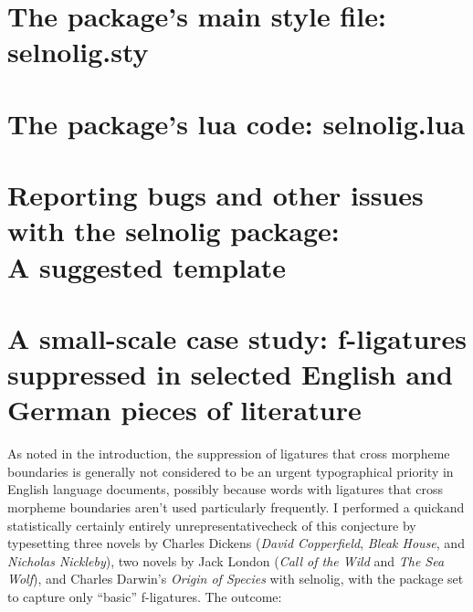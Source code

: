 \documentclass[11pt]{article}
\newcommand{\pkg}[1]{\textsf{#1}}
\begin{document}
\bigskip

\begin{multicols}{2}
\end{multicols}

\clearpage
\section[The package's main style file: selnolig.sty]
{The package's main style file: \pkg{selnolig.sty}}
\label{sec:sty}


\clearpage
\section[The package's lua code: selnolig.lua]{The package's lua code: \pkg{selnolig.lua}}
\label{sec:luacode}


\clearpage

\section[Reporting bugs and other issues with the selnolig package: A suggested template]{Reporting bugs and other issues with the \pkg{selnolig} package:\\A suggested template} \label{sec:template}


\clearpage
\selnoligon
\section{A small-scale case study: f-ligatures suppressed in selected English and German pieces of literature} \label{sec:budd}

As noted in the introduction, the suppression of ligatures that cross morpheme boundaries is generally not considered to be an urgent typographical priority in English language documents, possibly because words with ligatures that cross morpheme boundaries aren't used particularly frequently. I performed a quick\textemdash and statistically certainly entirely unrepresentative\textemdash check of this conjecture by typesetting three novels by Charles Dickens (\emph{David Copperfield}, \emph{Bleak House}, and \emph{Nicholas Nickleby}), two novels by Jack London (\emph{Call of the Wild} and \emph{The Sea Wolf}), and Charles Darwin's \emph{Origin of Species} with \pkg{selnolig}, with the package set to capture only \enquote{basic} f-ligatures. The outcome:
\end{document}
